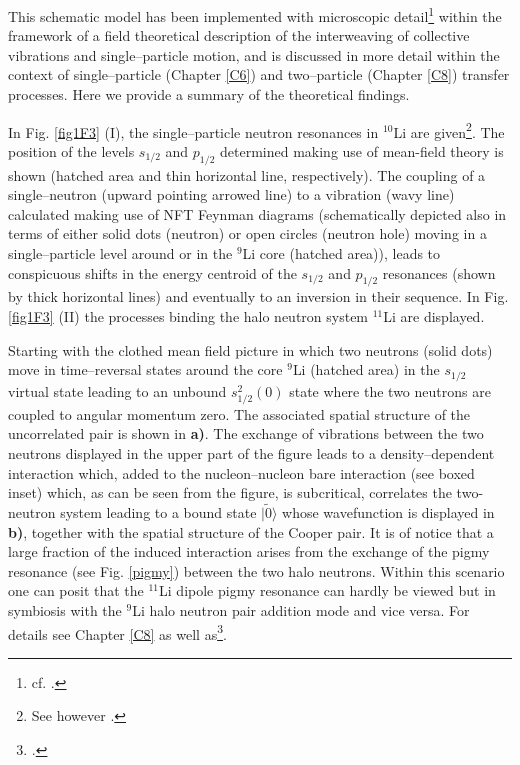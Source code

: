  
 
 This schematic model has been implemented with microscopic detail\footnote{cf. \cite{Barranco:01}.} within the framework of a field theoretical description of the interweaving of collective vibrations and single--particle motion, and is discussed in more detail within the context of single--particle (Chapter \ref{C6}) and two--particle (Chapter \ref{C8}) transfer processes. Here we provide a summary of the theoretical findings. 
 
 
 
 
 In Fig. \ref{fig1F3} (I), the single--particle neutron resonances in $^{10}$Li are given\footnote{See however \cite{Cavallaro:17}.}. The 
  position of the levels $s_{1/2}$ and $p_{1/2}$ determined making use
 of mean-field theory is shown (hatched area and thin horizontal
 line, respectively). The coupling of a single--neutron (upward
 pointing arrowed line) to a vibration (wavy line) calculated
 making use of NFT Feynman diagrams 
 (schematically depicted also in terms of either solid dots (neutron)
 or open circles (neutron hole) moving in a single--particle
 level around or in the $^9$Li core (hatched area)), leads to conspicuous
 shifts in the energy centroid of the $s_{1/2}$ and $p_{1/2}$ resonances
 (shown by thick horizontal lines) and eventually to
 an inversion in their sequence. In Fig. \ref{fig1F3} (II) the  processes binding the  halo neutron system $^{11}$Li are displayed. 
 
 
 
 
 
  Starting with the clothed mean  field
 picture in which two neutrons (solid dots) move in
 time--reversal states around the core $^{9}$Li (hatched area) in the
 $s_{1/2}$ virtual state leading to an unbound $s^2
 _{1/2}(0)$ state where the
 two neutrons are coupled to  angular momentum zero. The associated spatial structure of the uncorrelated pair is shown in \textbf{a)}. The exchange
 of vibrations between the two neutrons displayed in the upper
 part of the figure leads to a density--dependent interaction
 which, added to the nucleon--nucleon bare interaction (see boxed inset) which, as can be seen from the figure, is subcritical, correlates the
 two-neutron system leading to a bound state $|\tilde 0\rangle$ whose wavefunction is  displayed in \textbf{ b)}, together with the spatial structure of the Cooper pair. It is of notice that a large fraction of the induced interaction arises from the exchange of the pigmy resonance (see Fig. \ref{pigmy}) between the two halo neutrons.  Within this scenario one can posit that the $^{11}$Li dipole pigmy resonance can hardly be viewed but in symbiosis with the $^{9}$Li halo neutron pair addition mode and vice versa. For details see Chapter \ref{C8} as well as\footnote{\cite{Barranco:01}.}.
 
